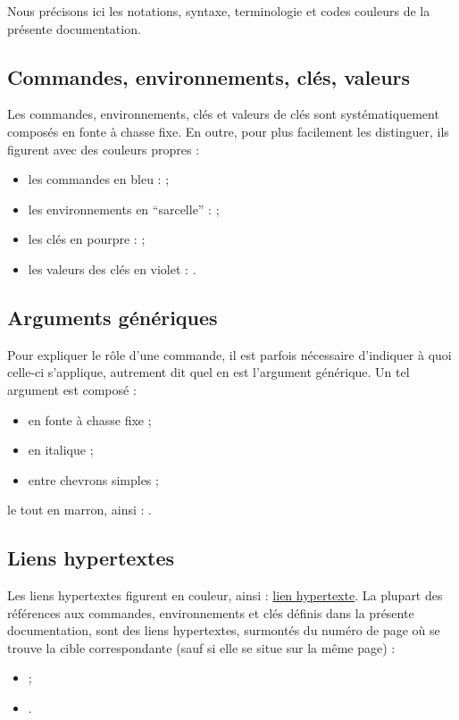 \documentclass[french,nolocaltoc]{nwejmart}
\newtheorem[style=definition]{fait}
\newtheorem[title=expérience]{experience}
\newtheorem[title-plural=anneaux]{anneau}
\newtheorem[title=idéal,title-plural=idéaux]{ideal}
\begin{document}
Nous précisons ici les notations, syntaxe, terminologie et codes couleurs de
la présente documentation.

\subsection{Commandes, environnements, clés, valeurs}\label{sec-comm-envir-cles}

Les commandes, environnements, clés et valeurs de clés sont systématiquement
composés en fonte à chasse fixe. En outre, pour plus facilement les
distinguer, ils figurent avec des couleurs propres :
\begin{itemize}
\item les commandes en bleu :  ;
\item les environnements en \enquote{sarcelle} :
   ;
\item les clés en pourpre :  ;
\item les valeurs des clés en violet : .
\end{itemize}

\subsection{Arguments génériques}
\label{sec-arguments-generiques}

Pour expliquer le rôle d'une commande, il est parfois nécessaire d'indiquer
à quoi celle-ci s'applique, autrement dit quel en est l'argument générique.
Un tel argument est composé :
\begin{itemize}
\item en fonte à chasse fixe ;
\item en italique ;
\item entre chevrons simples ;
\end{itemize}
le tout en marron, ainsi : .

\subsection{Liens hypertextes}
\label{sec-liens-hypertextes}

Les liens hypertextes figurent en couleur, ainsi :
\href{http://gte.univ-littoral.fr/members/dbitouze/pub/latex}{lien hypertexte}.
La plupart des références aux commandes, environnements et clés définis dans la
présente documentation, sont des liens hypertextes, surmontés du numéro de page
où se trouve la cible correspondante (sauf si elle se situe sur la même page) :
\begin{itemize}
\item {} ;
\item {}.
\end{itemize}
\end{document}
